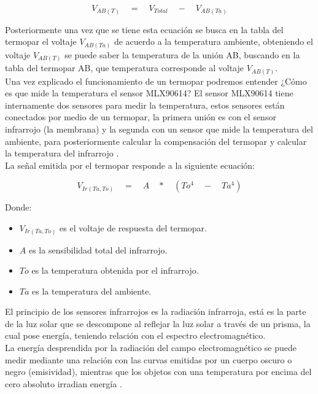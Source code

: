 \begin{equation}
V_{AB(T)} \quad = \quad V_{Total} \quad - \quad V_{AB(Ta)}
\end{equation}

Posteriormente una vez que se tiene esta ecuación se busca en la tabla del termopar el voltaje $V_{AB(Ta)}$ de acuerdo a la temperatura ambiente, obteniendo el voltaje $V_{AB(T)}$ se puede saber la temperatura de la unión AB, buscando en la tabla del termopar AB, que temperatura corresponde al voltaje $V_{AB(T)}$. \\

Una vez explicado el funcionamiento de un termopar podremos entender ¿Cómo es que mide la temperatura el sensor MLX90614? El sensor MLX90614 tiene internamente dos sensores para medir la temperatura, estos sensores están conectados por medio de un termopar, la primera unión es con el sensor infrarrojo (la membrana) y la segunda con un sensor que mide la temperatura del ambiente, para posteriormente calcular la compensación del termopar y calcular la temperatura del infrarrojo \cite{cuarentayseis}. \\

La señal emitida por el termopar responde a la siguiente ecuación:

\begin{equation}
V_{Ir(Ta,To)} \quad = \quad A \quad \ast \quad (To^4 \quad - \quad Ta^4)
\end{equation}

Donde: \\

\begin{itemize}
	\item $V_{Ir(Ta,To)}$ es el voltaje de respuesta del termopar.
	\item $A$ es la sensibilidad total del infrarrojo.
	\item $To$ es la temperatura obtenida por el infrarrojo.
	\item $Ta$ es la temperatura del ambiente.
\end{itemize}

El principio de los sensores infrarrojos es la radiación infrarroja, está es la parte de la luz solar que se descompone al reflejar la luz solar a través de un prisma, la cual pose energía, teniendo relación con el espectro electromagnético. \\

La energía desprendida por la radiación del campo electromagnético se puede medir mediante una relación con las curvas emitidas por un cuerpo oscuro o negro (emisividad), mientras que los objetos con una temperatura por encima del cero absoluto irradian energía \cite{cuarentaysiete}.


